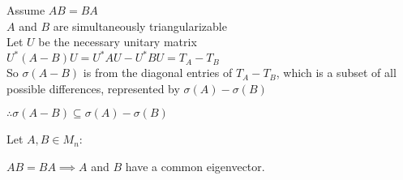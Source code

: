 \documentclass[letterpaper,12pt,fleqn]{article}
\renewcommand{\o}{\sigma}
\begin{document}
\begin{theproof}
  Assume $AB=BA$ \\
  $A$ and $B$ are simultaneously triangularizable \\
  Let $U$ be the necessary unitary matrix \\
  $U^*(A-B)U=U^*AU-U^*BU=T_A-T_B$ \\
  So $\o(A-B)$ is from the diagonal entries of $T_A-T_B$, which is a subset of all
  possible differences, represented by $\o(A)-\o(B)$

  $\therefore\o(A-B)\subseteq\o(A)-\o(B)$
\end{theproof}

\begin{theorem}
  Let $A,B\in M_n$:

  $AB=BA\implies A$ and $B$ have a common eigenvector.
\end{theorem}
\end{document}
